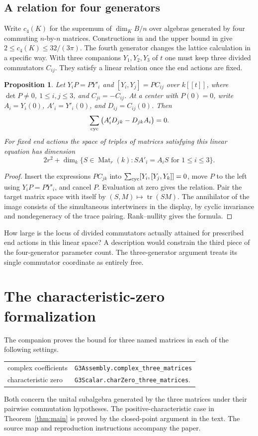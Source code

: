 \documentclass[11pt,reqno]{amsart}
\newtheorem{proposition}[theorem]{Proposition}
\theoremstyle{definition}
\newcommand{\Mat}{\operatorname{Mat}}
\newcommand{\tr}{\operatorname{tr}}
\begin{document}
\subsection*{A relation for four generators}
Write \(c_4(K)\) for the supremum of \(\dim_K B/n\) over algebras
generated by four commuting \(n\)-by-\(n\) matrices. Constructions in
\cite{LLSZ} and the upper bound in \cite[Corollary~1.4]{LSZ} give
\(2\leq c_4(K)\leq32/(3\pi)\). The fourth generator changes the lattice
calculation in a specific way. With three companions \(Y_1,Y_2,Y_3\)
of \(t\) one must keep three divided commutators \(C_{ij}\).
They satisfy a linear relation once the end actions are fixed.

\begin{proposition}\label{prop:jacobi}
Let \(Y_iP=PY'_i\) and \([Y_i,Y_j]=PC_{ij}\) over \(k[[t]]\), where
\(\det P\ne0\), \(1\leq i,j\leq3\), and \(C_{ji}=-C_{ij}\).
At a center with \(P(0)=0\), write \(A_i=Y_i(0)\), \(A'_i=Y'_i(0)\),
and \(D_{ij}=C_{ij}(0)\). Then
\[
              \sum_{\rm cyc}\big(A'_iD_{jk}-D_{jk}A_i\big)=0 .
\]
For fixed end actions the space of triples of matrices satisfying this
linear equation has dimension
\[
 2r^2+\dim_k\{S\in\Mat_r(k): S A'_i=A_i S\text{ for }1\leq i\leq3\}.
\]
\end{proposition}
\begin{proof}
Insert the expressions \(PC_{jk}\) into
\(\sum_{\rm cyc}[Y_i,[Y_j,Y_k]]=0\), move \(P\) to the left using
\(Y_iP=PY'_i\), and cancel \(P\). Evaluation at zero gives the relation.
Pair the target matrix space with itself by \((S,M)\mapsto\tr(SM)\).
The annihilator of the image consists of the simultaneous intertwiners
in the display, by cyclic invariance and nondegeneracy of the trace
pairing. Rank--nullity gives the formula.
\end{proof}

How large is the locus of divided commutators actually attained for
prescribed end actions in this linear space? A description would constrain
the third piece of the four-generator parameter count. The three-generator
argument treats its single commutator coordinate as entirely free.

\appendix
\section{The characteristic-zero formalization}\label{sec:lean}
The companion proves the bound for three named matrices in each of the
following settings.
\begin{center}
\begin{tabular}{ll}
complex coefficients & \texttt{G3Assembly.complex\_three\_matrices} \\
characteristic zero & \texttt{G3Scalar.charZero\_three\_matrices}.
\end{tabular}
\end{center}
Both concern the unital subalgebra generated by the three matrices under
their pairwise commutation hypotheses.
The positive-characteristic case in Theorem~\ref{thm:main} is proved by
the closed-point argument in the text. The source map and reproduction
instructions accompany the paper.
\end{document}
